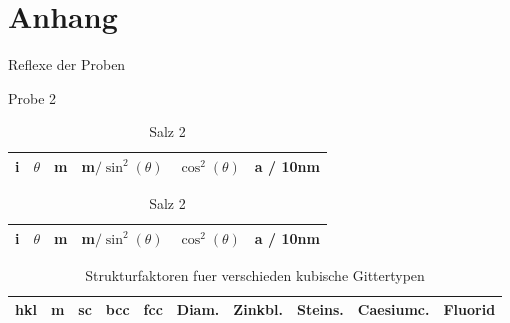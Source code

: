\section{Anhang}\label{sec:Anhang}

\begin{table}[ht]
		\centering
		\caption{Reflexe der Proben}
		\label{tab:wink}
		\begin{subtable}{\textwidth}
				\centering
				\caption{Probe 2}
				\begin{tabular}{c c c c c c}
						\toprule
						i & $\theta$ & m & m$/\sin^2(\theta)$ & $\cos^2(\theta)$ & a / 10nm \\ \midrule
						
						\bottomrule
				\end{tabular}
		\end{subtable}
		\begin{subtable}{\textwidth}
				\centering
				\caption{Salz 2}
				\begin{tabular}{c c c c c c}
						\toprule
						i & $\theta$ & m & m$/\sin^2(\theta)$ & $\cos^2(\theta)$ & a / 10nm \\ 
						\midrule
						
						\bottomrule
				\end{tabular}
		\end{subtable}
\end{table}

\begin{table}[ht]
		\centering
		\caption{Strukturfaktoren fuer verschieden kubische Gittertypen}
		\label{tab:struct}
		\begin{tabular}{c c c c c c c c c c}
				\toprule
				hkl & m & sc & bcc & fcc & Diam. & Zinkbl. & Steins. & Caesiumc. & Fluorid \\ 
				\midrule
					
				\bottomrule
		\end{tabular}
\end{table}

